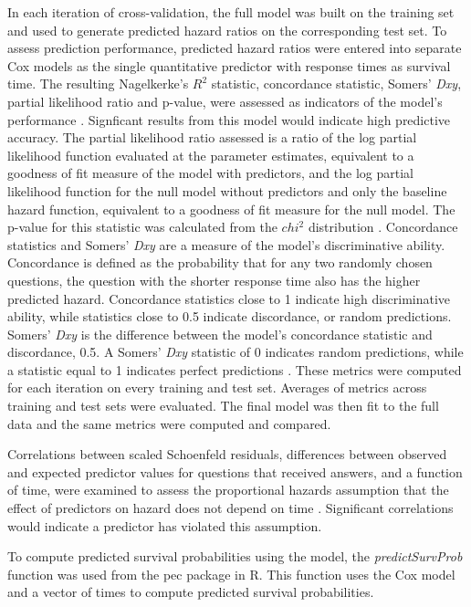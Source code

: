 \documentclass{article}
\begin{document}
In each iteration of cross-validation, the full model was built on the training set and used to generate predicted hazard ratios on the corresponding test set. To assess prediction performance, predicted hazard ratios were entered into separate Cox models as the single quantitative predictor with response times as survival time. The resulting Nagelkerke's $R^2$ statistic, concordance statistic, Somers' \textit{Dxy}, partial likelihood ratio and p-value, were assessed as indicators of the model's performance \cite{Chen}. Signficant results from this model would indicate high predictive accuracy. The partial likelihood ratio assessed is a ratio of the log partial likelihood function evaluated at the parameter estimates, equivalent to a goodness of fit measure of the model with predictors, and the log partial likelihood function for the null model without predictors and only the baseline hazard function, equivalent to a goodness of fit measure for the null model. The p-value for this statistic was calculated from the $chi^2$ distribution \cite{Oakes1981}. Concordance statistics and Somers' \textit{Dxy} are a measure of the model's discriminative ability. Concordance is defined as the probability that for any two randomly chosen questions, the question with the shorter response time also has the higher predicted hazard. Concordance statistics close to 1 indicate high discriminative ability, while statistics close to 0.5 indicate discordance, or random predictions. Somers' \textit{Dxy} is the difference between the model's concordance statistic and discordance, 0.5. A Somers' \textit{Dxy} statistic of 0 indicates random predictions, while a statistic equal to 1 indicates perfect predictions \cite{Harrell2015}. These metrics were computed for each iteration on every training and test set. Averages of metrics across training and test sets were evaluated. The final model was then fit to the full data and the same metrics were computed and compared. 

Correlations between scaled Schoenfeld residuals, differences between observed and expected predictor values for questions that received answers, and a function of time, were examined to assess the proportional hazards assumption that the effect of predictors on hazard does not depend on time \cite{Grambsch1994}. Significant correlations would indicate a predictor has violated this assumption.

To compute predicted survival probabilities using the model, the \textit{predictSurvProb} function was used from the pec package in R. This function uses the Cox model and a vector of times to compute predicted survival probabilities. 
\end{document}
